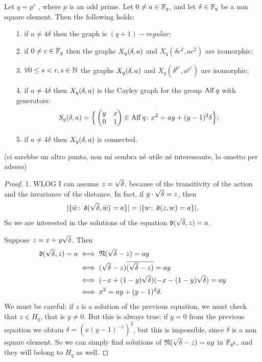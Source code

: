 \begin{theorem}\label{important}
Let $q=p^r$ , where $p$ is an odd prime. Let $0\neq a\in {\mathbb F}_q$, and let $\delta \in {\mathbb F}_q$ be a non square element.
Then the following holds:
\begin{itemize}
\item[1.] if $a\neq 4\delta$ then the graph is $(q+1)-regular$;
\item[2.] if $0\neq c\in {\mathbb F}_q$ then the graphs $X_q (\delta ,a)$ and $X_q(\delta c^2, a c^2)$ are isomorphic;  
\item[3.] $\forall 0 \leq s < r, s\in {\mathbb N}$ the graphs $X_q (\delta ,a)$ and $X_q (\delta^{p^s}, a^{p^s})$ are isomorphic;
\item[4.] if $a\neq 4\delta$ then $X_q (\delta ,a)$ is the Cayley graph for the group $\operatorname{Aff} q$ with generators:
\begin{equation}\label{generators}
	S_q(\delta,a) = \Big\{ \begin{pmatrix} y & x \\ 0 & 1 \end{pmatrix} \in \operatorname{Aff} q \colon x^2=ay+(y-1)^2 \delta \Big\};
\end{equation}
\item[5.] if $a\neq 4\delta$ then $X_q (\delta ,a)$ is connected.
\end{itemize}


(ci sarebbe un altro punto, non mi sembra né utile né interessante, lo ometto per adesso)
\begin{proof}
1. WLOG I can assume $z=\sqrt{\delta}$, because of the transitivity of the action and the invariance of the distance.
In fact, if $g \cdot \sqrt{\delta} = z$, then 
\begin{equation*}
\lvert \{\bar{w} \colon \operatorname{\mathfrak{d}} (\sqrt{\delta}, \bar{w})=a\}\rvert=\lvert \{w \colon \operatorname{\mathfrak{d}} (z,w)=a \} \rvert.
\end{equation*}
So we are interested in the solutions of the equation $\operatorname{\mathfrak{d}} (\sqrt{\delta}, z)=a$.

Suppose $z=x+y\sqrt{\delta}$. Then
\begin{align} \label{distance}
	\operatorname{\mathfrak{d}} (\sqrt{\delta}, z)=a & \iff \operatorname{\mathfrak{N}} (\sqrt{\delta} - z) = ay\\		\notag
					 & \iff (\sqrt{\delta} - z)\overline{(\sqrt{\delta} - z)}=ay\\ \notag
					 & \iff (-x+(1-y)\sqrt{\delta})(-x-(1-y)\sqrt{\delta} )=ay\\   \notag
					 & \iff x^2 = ay + (y-1)^2 \delta. 
\end{align}
We must be careful: if $z$ is a solution of the previous equation, we must check that $z\in H_q$, that is $y\neq 0$.
But this is always true: if $y=0$ from the previous equation we obtain $\delta=(x(y-1)^{-1})^2$,
but this is impossible, since $\delta$ is a non square element.
So we can simply find solutions of $\operatorname{\mathfrak{N}} (\sqrt{\delta} - z) = ay$ in ${\mathbb F}_{q^2}$, and they will belong to $H_q$ as well.


\end{proof}
\end{theorem}
